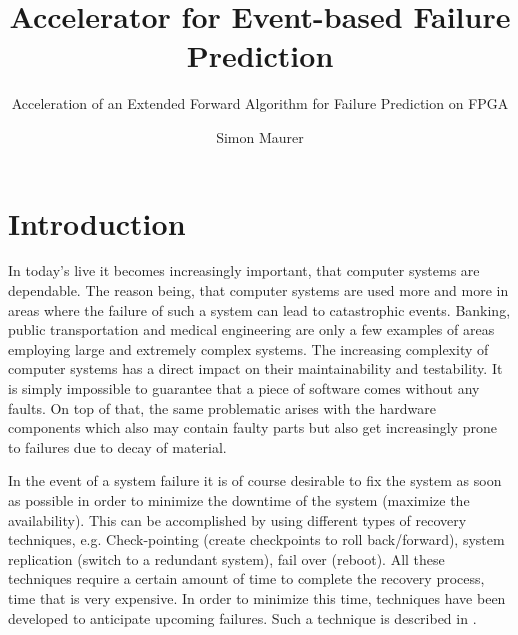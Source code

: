 \documentclass[mscthesis]{usiinfthesis}
\title{Accelerator for Event-based Failure Prediction} %
\subtitle{Acceleration of an Extended Forward Algorithm for Failure Prediction
    on FPGA}
\author{Simon Maurer} %
\begin{document}
\maketitle %

\frontmatter %

\begin{abstract}
\end{abstract}

%

\begin{acknowledgements}
\end{acknowledgements}

\tableofcontents 
\listoffigures %
\listoftables %

\mainmatter

\chapter{Introduction}
\label{ch:intro}
In today's live it becomes increasingly important, that computer systems are
dependable. The reason being, that computer systems are used more and more in
areas where the failure of such a system can lead to catastrophic events.
Banking, public transportation and medical engineering are only a few examples
of areas employing large and extremely complex systems. The increasing
complexity of computer systems has a direct impact on their maintainability and
testability. It is simply impossible to guarantee that a piece of software comes
without any faults. On top of that, the same problematic arises with the
hardware components which also may contain faulty parts but also get
increasingly prone to failures due to decay of material.

In the event of a system failure it is of course desirable to fix the system as
soon as possible in order to minimize the downtime of the system (maximize the
availability). This can be accomplished by using different types of recovery
techniques, e.g. Check-pointing (create checkpoints to roll back/forward),
system replication (switch to a redundant system), fail over (reboot). All these
techniques require a certain amount of time to complete the recovery process,
time that is very expensive. In order to minimize this time, techniques have
been developed to anticipate upcoming failures. Such a technique is described in
\cite{salfner08}.
\end{document}
